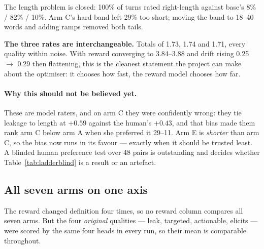 \documentclass[11pt]{article}
\newcommand{\qual}[1]{\textsf{#1}}
\begin{document}
The length problem is closed: 100\% of turns rated right-length against base's 8\% / 82\% / 10\%. Arm C's
hard band left 29\% too short; moving the band to 18--40 words and adding ramps removed both tails.

\textbf{The three rates are interchangeable.} Totals of 1.73, 1.74 and 1.71, every quality within noise.
With reward converging to 3.84--3.88 and drift rising 0.25 $\rightarrow$ 0.29 then flattening, this is the
cleanest statement the project can make about the optimiser: it chooses how fast, the reward model chooses
how far.

\paragraph{Why this should not be believed yet.} These are model raters, and on arm C they were confidently
wrong: they tie leakage to length at $+0.59$ against the human's $+0.43$, and that bias made them rank arm
C below arm A when she preferred it 29--11. Arm E is \emph{shorter} than arm C, so the bias now runs in its
favour --- exactly when it should be trusted least. A blinded human preference test over 48 pairs is
outstanding and decides whether Table~\ref{tab:ladderblind} is a result or an artefact.

\subsection{All seven arms on one axis}

The reward changed definition four times, so no reward column compares all seven arms. But the four
\emph{original} qualities --- \qual{leak}, \qual{targeted}, \qual{actionable}, \qual{elicits} --- were
scored by the same four heads in every run, so their mean is comparable throughout.
\end{document}
